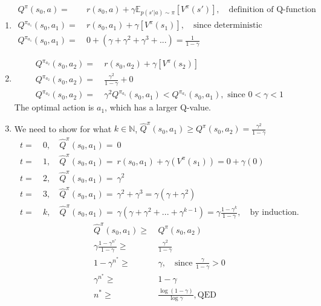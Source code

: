 \documentclass[11pt]{article}
\newcommand{\Ex}{\mathbb E}
\newcommand{\Vfunc}[2]{\ensuremath{V^{#1}(#2)}}
\newcommand{\Qfunc}[2]{\ensuremath{Q^{#1}(#2)}}
\begin{document}
\begin{enumerate}[label=(\alph*)]
	\item
	\begin{align*}
	\Qfunc{\pi}{s_0, a} =&\ r(s_0, a) + \gamma \Ex_{p(s'|a)\sim\pi}[\Vfunc{\pi}{s'}] , \quad \textrm{definition of Q-function} \\
	\Qfunc{\pi_{a_1}}{s_0, a_1} =&\ r(s_0, a_1) + \gamma[\Vfunc{\pi}{s_1}] , \quad \textrm{since deterministic} \\ 
	\Qfunc{\pi_{a_1}}{s_0, a_1} =&\ 0 + (\gamma + \gamma^2 + \gamma^3 + ...) = \frac{1}{1-\gamma} \quad
	\end{align*}
	
	\item
	\begin{align*}
	\Qfunc{\pi_{a_2}}{s_0, a_2} =&\ r(s_0, a_2) + \gamma[\Vfunc{\pi}{s_2}] \\ 
	\Qfunc{\pi_{a_2}}{s_0, a_2} =&\ \frac{\gamma^2}{1-\gamma} + 0 \\ 
	\Qfunc{\pi_{a_2}}{s_0, a_2} =&\ \gamma^2 \Qfunc{\pi_{a_1}}{s_0, a_1} < \Qfunc{\pi_{a_1}}{s_0, a_1}, \textrm{ since $0<\gamma<1$}
	\end{align*}
	The optimal action is $a_1$, which has a larger Q-value.
	
	\item We need to show for what $k\in \mathbb{N}$,  $\hat{Q}^{\pi}(s_0, a_1) \geq Q^{\pi}(s_0, a_2) = \frac{\gamma^2}{1-\gamma}$ \\ 
	\begin{align*}
	t=&\ 0, \quad \hat{Q}^{\pi}(s_0, a_1) =\ 0 \\
	t=&\ 1, \quad \hat{Q}^{\pi}(s_0, a_1) =\ r(s_0, a_1) + \gamma(\Vfunc{\pi}{s_1}) = 0 + \gamma(0) \\
	t=&\ 2, \quad \hat{Q}^{\pi}(s_0, a_1) =\ \gamma^2 \\
	t=&\ 3, \quad \hat{Q}^{\pi}(s_0, a_1) =\ \gamma^2+\gamma^3 = \gamma(\gamma+\gamma^2) \\
	t=&\ k, \quad \hat{Q}^{\pi}(s_0, a_1) =\ \gamma(\gamma+\gamma^2+...+\gamma^{k-1}) = \gamma \frac{1-\gamma^k}{1-\gamma}, \quad \textrm{by induction.}
	\end{align*}
	\begin{align*}
	\hat{Q}^{\pi}(s_0, a_1) \geq&\ \Qfunc{\pi}{s_0, a_2} \\ 
	\gamma \frac{1-\gamma^{n^*}}{1-\gamma} \geq&\ \frac{\gamma^2}{1-\gamma} \\ 
	1-\gamma^{n^*} \geq&\ \gamma, \quad \textrm{since $\frac{\gamma}{1-\gamma} > 0$} \\
	\gamma^{n^*} \geq&\ 1-\gamma \\
	n^* \geq&\ \frac{\log(1-\gamma)}{\log \gamma}, \textrm{QED}
	\end{align*}
	
\end{enumerate}
\end{document}

